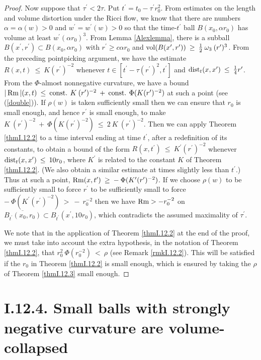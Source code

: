 \begin{proof}
Now suppose that $\tau^\prime < 2 \tau$. Put
$t^\prime = t_0 - \tau^\prime r_0^2$.
From estimates on
the length and volume distortion under the Ricci flow, we know that
there are numbers $\alpha = \alpha(w) > 0$ and
$w^\prime = w^\prime(w) > 0$ so that the time-$t^\prime$ ball
$B(x_0, \alpha r_0)$ has volume at least $w^\prime (\alpha r_0)^3$.
From Lemma \ref{Alexlemma}, there is a subball
$B(x^\prime, r^\prime) \subset B(x_0, \alpha r_0)$ with
$r^\prime \ge c \alpha r_0$ and $\operatorname{vol}(B(x^\prime, r^\prime)) \: \ge \:
\frac12 \: \omega_3 \: (r^\prime)^3$. From the preceding
pointpicking argument, we have the estimate $R(x,t) \: \le \: K
(r^\prime)^{-2}$ whenever $t \in [t^\prime - \tau (r^\prime)^2,
t^\prime]$ and $\operatorname{dist}_t(x, x^\prime) \: \le \: \frac14 r^\prime$.
From the $\Phi$-almost nonnegative curvature,
we have a bound
$|\operatorname{Rm}|(x,t) \: \le \:
\operatorname{const.} \: K \: (r^\prime)^{-2} \: + \: \operatorname{const.} \: \Phi( K (r^\prime)^{-2})$
at
such a point (see (\ref{double})).  If $\rho(w)$ is taken sufficiently
small then we can ensure that $r_0$ is small enough, and
hence $r^\prime$ is small enough, to make
$K \: (r^\prime)^{-2} \: + \: \Phi( K (r^\prime)^{-2}) \: \le \:
2 \: K \: (r^\prime)^{-2}$.
Then we can apply
Theorem \ref{thmI.12.2} to a time interval ending at time
$t^\prime$, after a redefinition of its
constants, to obtain a bound of the form
$R(x, t^\prime) \: \le \: K^\prime (r^\prime)^{-2}$
whenever $\operatorname{dist}_{t}(x, x^\prime) \: \le \: 10 r_0$, where
$K^\prime$ is related to the constant
$K$ of Theorem \ref{thmI.12.2}. (We also obtain a similar estimate at
times slightly less than $t^\prime$.)  Thus at such a point,
$\operatorname{Rm}(x, t^\prime) \: \ge \: - \:
\Phi(K^\prime (r^\prime)^{-2})$.  If we choose $\rho(w)$ to be
sufficiently small to force $r^\prime$ to be sufficiently small to force
$- \:
\Phi(K^\prime (r^\prime)^{-2})\: > \: - \: r_0^{-2}$
then we have
$\operatorname{Rm} > - r_0^{-2}$ on $\overline{B_{t^\prime}(x_0, r_0)} \subset
B_{t^\prime}(x^\prime, 10r_0)$, which
contradicts the assumed maximality of $\tau^\prime$.

We note that in the application of Theorem \ref{thmI.12.2}
at the end of the proof, we must take into account the
extra hypothesis, in the notation of
Theorem \ref{thmI.12.2}, that
$r_0^2 \: \Phi(r_0^{-2}) \: < \: \rho$
(see Remark \ref{rmkI.12.2}).  This
will be satisfied if the $r_0$ in Theorem \ref{thmI.12.2} is small
enough, which is ensured
by taking the $\rho$ of Theorem \ref{thmI.12.3} small enough.
\end{proof}

\section{I.12.4. Small balls with strongly negative curvature are
volume-collapsed}
\label{I.12.4}

